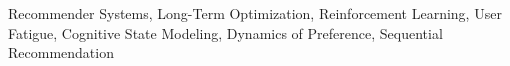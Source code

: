 \documentclass[conference]{IEEEtran}
\begin{document}
\begin{IEEEkeywords}
Recommender Systems, Long-Term Optimization, Reinforcement Learning,
User Fatigue, Cognitive State Modeling, Dynamics of Preference,
Sequential Recommendation
\end{IEEEkeywords}


% 

% 


% 
% 
% 





% 



\vfill
\end{document}
